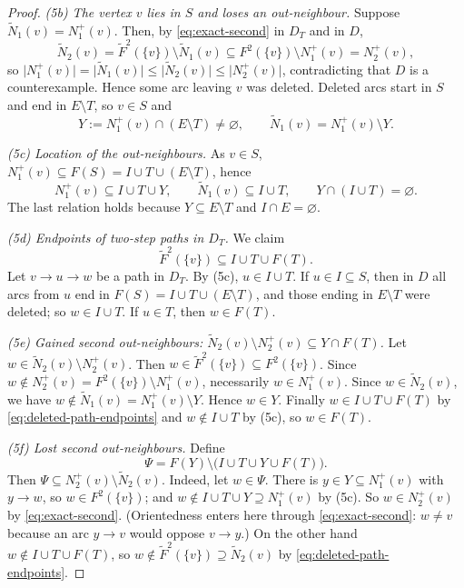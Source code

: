 \documentclass[11pt]{article}
\theoremstyle{remark}
\newcommand{\abs}[1]{\lvert #1\rvert}
\newcommand{\tN}{\widetilde N}
\newcommand{\tF}{\widetilde F}
\begin{document}
\begin{proof}
\smallskip\noindent\emph{(5b) The vertex $v$ lies in $S$ and loses an
out-neighbour.} Suppose $\tN_1(v)=N_1^+(v)$. Then, by
\eqref{eq:exact-second} in $D_T$ and in $D$,
\[
 \tN_2(v)=\tF^2(\{v\})\setminus\tN_1(v)
 \subseteq F^2(\{v\})\setminus N_1^+(v)=N_2^+(v),
\]
so $\abs{N_1^+(v)}=\abs{\tN_1(v)}\le\abs{\tN_2(v)}\le\abs{N_2^+(v)}$,
contradicting that $D$ is a counterexample. Hence some arc leaving $v$ was
deleted. Deleted arcs start in $S$ and end in $E\setminus T$, so
$v\in S$ and
\[
  Y:=N_1^+(v)\cap(E\setminus T)\ne\varnothing,
  \qquad \tN_1(v)=N_1^+(v)\setminus Y .
\]

\smallskip\noindent\emph{(5c) Location of the out-neighbours.}
As $v\in S$, $N_1^+(v)\subseteq F(S)=I\cup T\cup(E\setminus T)$, hence
\[
 N_1^+(v)\subseteq I\cup T\cup Y,\qquad
 \tN_1(v)\subseteq I\cup T,\qquad
 Y\cap(I\cup T)=\varnothing .
\]
The last relation holds because $Y\subseteq E\setminus T$ and
$I\cap E=\varnothing$.

\smallskip\noindent\emph{(5d) Endpoints of two-step paths in $D_T$.}
We claim
\begin{equation}
\label{eq:deleted-path-endpoints}
  \tF^2(\{v\})\subseteq I\cup T\cup F(T).
\end{equation}
Let $v\to u\to w$ be a path in $D_T$. By (5c), $u\in I\cup T$.
If $u\in I\subseteq S$, then in $D$ all arcs from $u$ end in
$F(S)=I\cup T\cup(E\setminus T)$, and those ending in $E\setminus T$ were
deleted; so $w\in I\cup T$. If $u\in T$, then $w\in F(T)$.

\smallskip\noindent\emph{(5e) Gained second out-neighbours:
$\tN_2(v)\setminus N_2^+(v)\subseteq Y\cap F(T)$.}
Let $w\in\tN_2(v)\setminus N_2^+(v)$. Then
$w\in\tF^2(\{v\})\subseteq F^2(\{v\})$. Since
$w\notin N_2^+(v)=F^2(\{v\})\setminus N_1^+(v)$, necessarily
$w\in N_1^+(v)$. Since $w\in\tN_2(v)$, we have
$w\notin\tN_1(v)=N_1^+(v)\setminus Y$. Hence $w\in Y$. Finally
$w\in I\cup T\cup F(T)$ by \eqref{eq:deleted-path-endpoints} and
$w\notin I\cup T$ by (5c), so $w\in F(T)$.

\smallskip\noindent\emph{(5f) Lost second out-neighbours.} Define
\[
  \Psi=F(Y)\setminus\bigl(I\cup T\cup Y\cup F(T)\bigr).
\]
Then $\Psi\subseteq N_2^+(v)\setminus\tN_2(v)$. Indeed, let $w\in\Psi$.
There is $y\in Y\subseteq N_1^+(v)$ with $y\to w$, so $w\in F^2(\{v\})$;
and $w\notin I\cup T\cup Y\supseteq N_1^+(v)$ by (5c). So
$w\in N_2^+(v)$ by \eqref{eq:exact-second}. (Orientedness enters here
through \eqref{eq:exact-second}: $w\ne v$ because an arc $y\to v$ would
oppose $v\to y$.) On the other hand $w\notin I\cup T\cup F(T)$, so
$w\notin\tF^2(\{v\})\supseteq\tN_2(v)$ by
\eqref{eq:deleted-path-endpoints}.


\end{proof}
\end{document}
